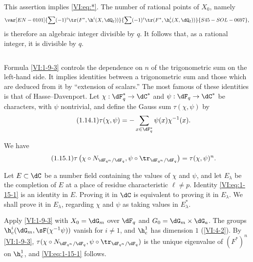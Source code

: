 This assertion implies \eqref{VI:eq:*}. The number of rational points of 
$X_0$, namely 
\[\var[EN-0101]{\sum (-1)^i \tr(F^\ast,\h^i(X,\dQ_\ell))}{\sum (-1)^i \tr(F^\ast,\h_c^i(X,\dQ_\ell))}{S45-SOL-0697}\text{,}\]
 is therefore an 
algebraic integer divisible by $q$. It follows that, as a rational integer, 
it is divisible by $q$. 






\subsection{}\label{VI:1-14}

Formula \ref{VI:1-9-3} controls the dependence on $n$ of the trigonometric 
sum on the left-hand side. It implies identities between a 
trigonometric sum and those which are deduced from it by ``extension of 
scalars.'' The most famous of these identities is that of 
Hasse--Davenport. Let $\chi:\dF_q^\ast \to \dC^\ast$ and 
$\psi:\dF_q\to \dC^\ast$ be characters, with $\psi$ nontrivial, and 
define the Gauss sum $\tau(\chi,\psi)$ by 
\begin{equation*}\tag{1.14.1}\label{VI:eq:1-14-1}
  \tau(\chi,\psi) = - \sum_{x\in \dF_q^\ast} \psi(x) \chi^{-1}(x) \text{.}
\end{equation*}





\begin{theorem_}\label{VI:1-15}
We have 
\begin{equation*}\tag{1.15.1}\label{VI:eq:1-15-1}
  \tau\left(\chi\circ N_{\dF_{q^n}/\dF_q},\psi\circ \tr_{\dF_{q^n}/\dF_q}\right) = \tau(\chi,\psi)^n \text{.}
\end{equation*}
\end{theorem_}

Let $E\subset \dC$ be a number field containing the values of $\chi$ and 
$\psi$, and let $E_\lambda$ be the completion of $E$ at a place of residue 
characteristic $\ell\ne p$. Identity \eqref{VI:eq:1-15-1} is an identity in 
$E$. Proving it in $\dC$ is equivalent to proving it in $E_\lambda$. We 
shall prove it in $E_\lambda$, regarding $\chi$ and $\psi$ as taking values 
in $E_\lambda^\ast$.

Apply \ref{VI:1-9-3} with $X_0=\dG_m$ over $\dF_q$ and 
$G_0=\dG_m\times \dG_a$. The groups $\h_c^i(\dG_m,\sF(\chi^{-1}\psi))$ vanish for 
$i\ne 1$, and $\h_c^1$ has dimension $1$ (\ref{VI:4-2}). By 
\ref{VI:1-9-3}, 
$\tau(\chi\circ N_{\dF_{q^n}/\dF_q},\psi\circ \tr_{\dF_{q^n}/\dF_q})$ is 
the unique eigenvalue of $(F^\ast)^n$ on $\h_c^1$, and \eqref{VI:eq:1-15-1} 
follows. 

